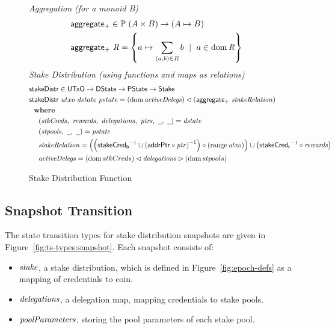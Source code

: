 \begin{figure}[htb]
  \emph{Aggregation (for a monoid B)}
  \begin{align*}
      & \mathsf{aggregate_{+}} \in \mathbb{P}~(A \times B) \to (A\mapsto B) \\
      & \mathsf{aggregate_{+}}~\mathit{R} = \left\{a\mapsto \sum_{(a,b)\in\mathit{R}}b
          ~\mid~a\in\operatorname{dom}\mathit{R}\right\} \\
  \end{align*}
  \emph{Stake Distribution (using functions and maps as relations)}
  \begin{align*}
      & \fun{stakeDistr} \in \UTxO \to \DState \to \PState \to \Stake \\
      & \fun{stakeDistr}~{utxo}~{dstate}~{pstate} =
      (\dom{\var{activeDelegs}})\restrictdom\left(\fun{aggregate_{+}}~\var{stakeRelation}\right)\\
      & \where \\
      & ~~~~ (\var{stkCreds},~\var{rewards},~\var{delegations},~\var{ptrs},~\wcard,~\wcard)
        = \var{dstate} \\
      & ~~~~ (\var{stpools},~\wcard,~\wcard) = \var{pstate} \\
      & ~~~~ \var{stakeRelation} = \left(
        \left(\fun{stakeCred_b}^{-1}\cup\left(\fun{addrPtr}\circ\var{ptr}\right)^{-1}\right)
        \circ\left(\range{\var{utxo}}\right)
        \right)
        \cup \left(\fun{stakeCred_r}^{-1}\circ\var{rewards}\right) \\
      & ~~~~ \var{activeDelegs} =
               (\dom{stkCreds}) \restrictdom \var{delegations} \restrictrange (\dom{stpools}) \\
  \end{align*}

  \caption{Stake Distribution Function}
  \label{fig:functions:stake-distribution}
\end{figure}

\clearpage

\subsection{Snapshot Transition}
\label{sec:snapshots}

The state transition types for stake distribution snapshots are given in
Figure~\ref{fig:ts-types:snapshot}.
Each snapshot consists of:
\begin{itemize}
  \item $\mathit{stake}$, a stake distribution, which is defined in
    Figure~\ref{fig:epoch-defs} as a mapping of credentials to coin.
  \item $\mathit{delegations}$, a delegation map, mapping credentials to stake pools.
  \item $\mathit{poolParameters}$, storing the pool parameters of each stake pool.
\end{itemize}

